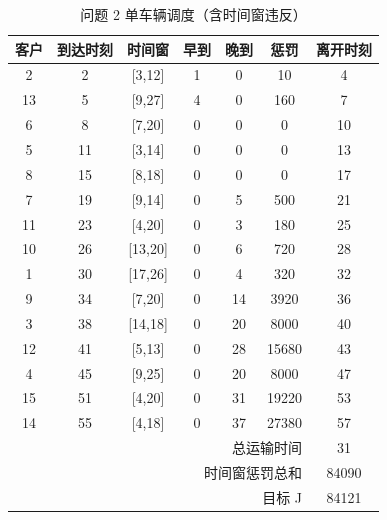 \begin{table}[htbp]
\centering
\caption{问题 2 单车辆调度（含时间窗违反）}\label{tab:q2_schedule}
\begin{tabular}{ccccccc}
\toprule
客户 & 到达时刻 & 时间窗 & 早到 & 晚到 & 惩罚 & 离开时刻 \\
\midrule
2 & 2 & [3,12] & 1 & 0 & 10 & 4 \\
13 & 5 & [9,27] & 4 & 0 & 160 & 7 \\
6 & 8 & [7,20] & 0 & 0 & 0 & 10 \\
5 & 11 & [3,14] & 0 & 0 & 0 & 13 \\
8 & 15 & [8,18] & 0 & 0 & 0 & 17 \\
7 & 19 & [9,14] & 0 & 5 & 500 & 21 \\
11 & 23 & [4,20] & 0 & 3 & 180 & 25 \\
10 & 26 & [13,20] & 0 & 6 & 720 & 28 \\
1 & 30 & [17,26] & 0 & 4 & 320 & 32 \\
9 & 34 & [7,20] & 0 & 14 & 3920 & 36 \\
3 & 38 & [14,18] & 0 & 20 & 8000 & 40 \\
12 & 41 & [5,13] & 0 & 28 & 15680 & 43 \\
4 & 45 & [9,25] & 0 & 20 & 8000 & 47 \\
15 & 51 & [4,20] & 0 & 31 & 19220 & 53 \\
14 & 55 & [4,18] & 0 & 37 & 27380 & 57 \\
\midrule
\multicolumn{6}{r}{总运输时间} & 31 \\
\multicolumn{6}{r}{时间窗惩罚总和} & 84090 \\
\multicolumn{6}{r}{目标 J} & 84121 \\
\bottomrule
\end{tabular}
\end{table}
